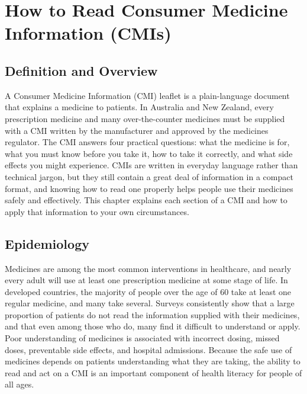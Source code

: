 \chapter{How to Read Consumer Medicine Information (CMIs)}

\section*{Definition and Overview}
A Consumer Medicine Information (CMI) leaflet is a plain-language document that explains a medicine to patients. In Australia and New Zealand, every prescription medicine and many over-the-counter medicines must be supplied with a CMI written by the manufacturer and approved by the medicines regulator. The CMI answers four practical questions: what the medicine is for, what you must know before you take it, how to take it correctly, and what side effects you might experience. CMIs are written in everyday language rather than technical jargon, but they still contain a great deal of information in a compact format, and knowing how to read one properly helps people use their medicines safely and effectively. This chapter explains each section of a CMI and how to apply that information to your own circumstances.

\section*{Epidemiology}
Medicines are among the most common interventions in healthcare, and nearly every adult will use at least one prescription medicine at some stage of life. In developed countries, the majority of people over the age of 60 take at least one regular medicine, and many take several. Surveys consistently show that a large proportion of patients do not read the information supplied with their medicines, and that even among those who do, many find it difficult to understand or apply. Poor understanding of medicines is associated with incorrect dosing, missed doses, preventable side effects, and hospital admissions. Because the safe use of medicines depends on patients understanding what they are taking, the ability to read and act on a CMI is an important component of health literacy for people of all ages.

